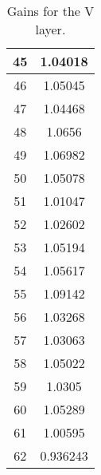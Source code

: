 \begin{table}[h]
\begin{subtable}[h]{2in}
{\begin{tabular}{|c|c|}
45	&	1.04018	\\	\hline
46	&	1.05045	\\	\hline
47	&	1.04468	\\	\hline
48	&	1.0656	\\	\hline
49	&	1.06982	\\	\hline
50	&	1.05078	\\	\hline
51	&	1.01047	\\	\hline
52	&	1.02602	\\	\hline
53	&	1.05194	\\	\hline
54	&	1.05617	\\	\hline
55	&	1.09142	\\	\hline
56	&	1.03268	\\	\hline
57	&	1.03063	\\	\hline
58	&	1.05022	\\	\hline
59	&	1.0305	\\	\hline
60	&	1.05289	\\	\hline
61	&	1.00595	\\	\hline
62	&	0.936243	\\	\hline
        \end{tabular}
        }
        \caption{Gains for the V layer.}
    \end{subtable}
    \quad
    \begin{subtable}[h]{2in}
        \centering{}
\end{subtable}
\end{table}
